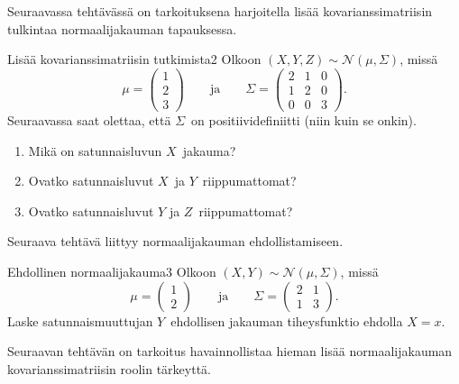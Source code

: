 \documentclass[11pt,a4paper]{amsart}
\newcommand{\1}{\mathbf{1}}
\begin{document}
Seuraavassa tehtävässä on tarkoituksena harjoitella lisää kovarianssimatriisin tulkintaa normaalijakauman tapauksessa.

\begin{Exercises}{Lisää kovarianssimatriisin tutkimista}{2}
Olkoon $(X,Y,Z)\sim \mathcal N(\mu,\Sigma)$, missä 
\[
\mu=\begin{pmatrix}
1 \\
2\\
3
\end{pmatrix} \qquad \text{ja} \qquad \Sigma=\begin{pmatrix}
2 & 1 & 0 \\
1 & 2 & 0\\
0 & 0 & 3
\end{pmatrix}.
\]
Seuraavassa saat olettaa, että $\Sigma$ on positiividefiniitti (niin kuin se onkin).
\begin{enumerate}
\item Mikä on satunnaisluvun $X$ jakauma?
    
\item Ovatko satunnaisluvut $X$ ja $Y$ riippumattomat?

    
\item Ovatko satunnaisluvut $Y$ ja $Z$ riippumattomat?

    
\end{enumerate}
\end{Exercises}

Seuraava tehtävä liittyy normaalijakauman ehdollistamiseen.

\begin{Exercises}{Ehdollinen normaalijakauma}{3}
Olkoon $(X,Y)\sim \mathcal N(\mu,\Sigma)$, missä 
\[
\mu=\begin{pmatrix}
1 \\ 
2
\end{pmatrix} \qquad \text{ja} \qquad \Sigma=\begin{pmatrix}
2 & 1\\
1 & 3
\end{pmatrix}.
\]
Laske satunnaismuuttujan $Y$ ehdollisen jakauman tiheysfunktio ehdolla $X=x$.

    
\end{Exercises}

Seuraavan tehtävän on tarkoitus havainnollistaa hieman lisää normaalijakauman kovarianssimatriisin roolin tärkeyttä.
\end{document}
